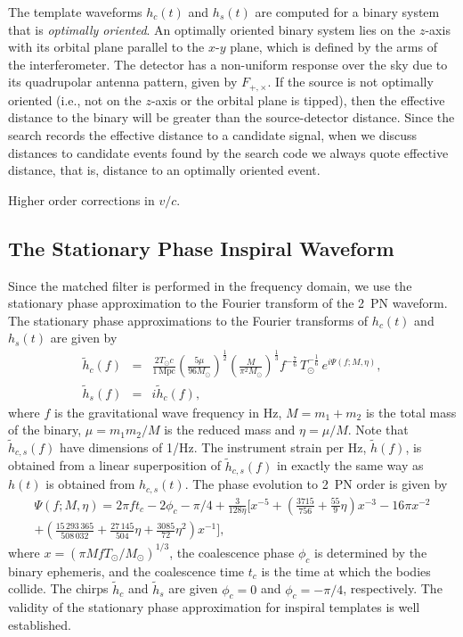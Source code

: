 The template waveforms $h_c(t)$ and $h_s(t)$ are computed for a binary
system that is {\it optimally oriented}. An optimally oriented binary system
lies on the $z$-axis with its orbital plane parallel to the $x$-$y$ plane,
which is defined by the arms of the interferometer. The detector has a
non-uniform response over the sky due to its quadrupolar antenna pattern,
given by $F_{+,\times}$. If the source is not optimally oriented (i.e., not on the
$z$-axis or the orbital plane is tipped), then the effective distance to the
binary will be greater than the source-detector distance. Since the search
records the effective distance to a candidate signal, when we discuss
distances to candidate events found by the search code we always quote
effective distance, that is, distance to an optimally oriented event.

Higher order corrections in $v/c$.

\subsection{The Stationary Phase Inspiral Waveform}

Since the matched filter is performed in the frequency domain, we use the
stationary phase approximation to the Fourier transform of the 2~PN
waveform\cite{poissonwill}. The stationary phase approximations to the Fourier
transforms of $h_c(t)$ and $h_s(t)$ are given by
\begin{eqnarray}
\label{eq:spcos}
\tilde{h}_c(f)&=&\frac{2T_\odot c}{1\,\mathrm{Mpc}}
\left(\frac{5\mu}{96M_\odot}\right)^\frac{1}{2}
\left(\frac{M}{\pi^2M_\odot}\right)^\frac{1}{3}%
f^{-\frac{7}{6}}\,T_\odot^{-\frac{1}{6}}\,
e^{i\Psi(f;M,\eta)},\\%
\label{eq:hsorthog}
\tilde{h}_s(f)&=&i\tilde{h}_c(f),
\end{eqnarray}
where $f$ is the gravitational wave frequency in Hz, $M = m_1+m_2$ 
is the total mass of the binary, $\mu = m_1 m_2 / M$ is the reduced mass and
$\eta = \mu/M$.  Note that $\tilde{h}_{c,s}(f)$ have dimensions of 1/Hz.  The
instrument strain per Hz, $\tilde{h}(f)$, is obtained from a linear
superposition of $\tilde{h}_{c,s}(f)$ in exactly the same way as $h(t)$ is
obtained from $h_{c,s}(t)$. The phase evolution to 2~PN order is given by
\begin{eqnarray}
\Psi(f;M,\eta) = 2\pi ft_c-2\phi_c-\pi/4+\frac{3}{128\eta}\biggl[x^{-5}+
\left(\frac{3715}{756}+\frac{55}{9}\eta\right)x^{-3}
-16\pi x^{-2} \nonumber\\
+\left(\frac{15\,293\,365}{508\,032}+\frac{27\,145}{504}\eta
+\frac{3085}{72}\eta^2\right)x^{-1}\biggr],
\end{eqnarray}
where $x=(\pi MfT_\odot/M_\odot)^{1/3}$, the coalescence phase
$\phi_c$ is determined by the binary ephemeris, and the coalescence
time $t_c$ is the time at which the bodies collide.  The chirps
$\tilde{h}_c$ and $\tilde{h}_s$ are given $\phi_c=0$ and
$\phi_c=-\pi/4$, respectively. The validity of the stationary phase
approximation for inspiral templates is well established\cite{spvalid}.


